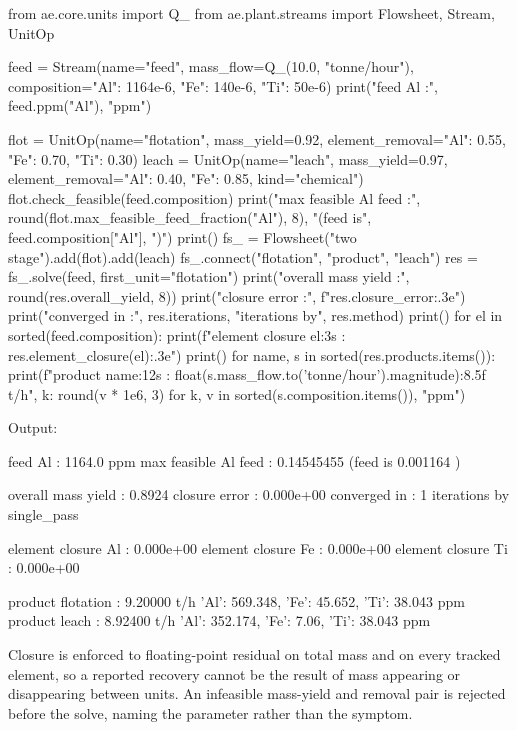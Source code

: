 \documentclass[10pt,a4paper,twoside]{report}
\begin{document}
\begin{doctestblock}
from ae.core.units import Q_
from ae.plant.streams import Flowsheet, Stream, UnitOp

feed = Stream(name="feed", mass_flow=Q_(10.0, "tonne/hour"),
              composition={"Al": 1164e-6, "Fe": 140e-6, "Ti": 50e-6})
print("feed Al                 :", feed.ppm("Al"), "ppm")

flot = UnitOp(name="flotation", mass_yield=0.92,
              element_removal={"Al": 0.55, "Fe": 0.70, "Ti": 0.30})
leach = UnitOp(name="leach", mass_yield=0.97,
               element_removal={"Al": 0.40, "Fe": 0.85}, kind="chemical")
flot.check_feasible(feed.composition)
print("max feasible Al feed    :", round(flot.max_feasible_feed_fraction("Al"), 8),
      "(feed is", feed.composition["Al"], ")")
print()
fs_ = Flowsheet("two stage").add(flot).add(leach)
fs_.connect("flotation", "product", "leach")
res = fs_.solve(feed, first_unit="flotation")
print("overall mass yield      :", round(res.overall_yield, 8))
print("closure error           :", f"{res.closure_error:.3e}")
print("converged in            :", res.iterations, "iterations by", res.method)
print()
for el in sorted(feed.composition):
    print(f"element closure {el:3s}     : {res.element_closure(el):.3e}")
print()
for name, s in sorted(res.products.items()):
    print(f"product {name:12s}    : {float(s.mass_flow.to('tonne/hour').magnitude):8.5f} t/h",
          {k: round(v * 1e6, 3) for k, v in sorted(s.composition.items())}, "ppm")
\end{doctestblock}

{\footnotesize\color{slate}Output:\par}

\begin{outputblock}
feed Al                 : 1164.0 ppm
max feasible Al feed    : 0.14545455 (feed is 0.001164 )

overall mass yield      : 0.8924
closure error           : 0.000e+00
converged in            : 1 iterations by single_pass

element closure Al      : 0.000e+00
element closure Fe      : 0.000e+00
element closure Ti      : 0.000e+00

product flotation       :  9.20000 t/h {'Al': 569.348, 'Fe': 45.652, 'Ti': 38.043} ppm
product leach           :  8.92400 t/h {'Al': 352.174, 'Fe': 7.06, 'Ti': 38.043} ppm
\end{outputblock}

Closure is enforced to floating-point residual on total mass and on every tracked element, so a reported recovery cannot be the result of mass appearing or disappearing between units. An infeasible mass-yield and removal pair is rejected before the solve, naming the parameter rather than the symptom.
\end{document}
